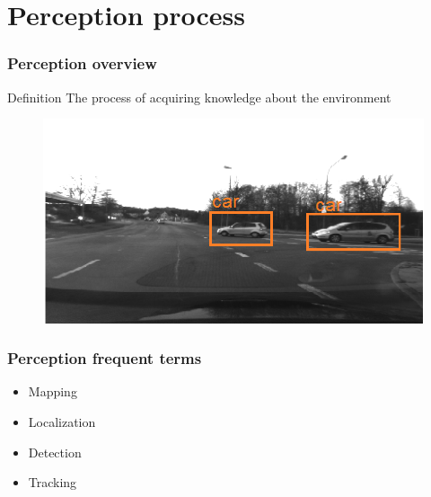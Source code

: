 \documentclass{beamer}
\begin{document}
\section{Perception process}

	\begin{frame}
		\frametitle{Perception overview}
		\begin{block}{Definition}
			The process of acquiring knowledge about the environment \cite{iyengar1991autonomous}
		\end{block}	
		
		\begin{figure}[h]
			\center
			\includegraphics[scale=0.3]{img/fig:perception:ex1}
		\end{figure}
		 
	\end{frame}

	\begin{frame}
		\frametitle{Perception frequent terms}

		\begin{itemize}
			\item Mapping
			\item Localization
			\item Detection
			\item Tracking
		\end{itemize}				

	\end{frame}
\end{document}
